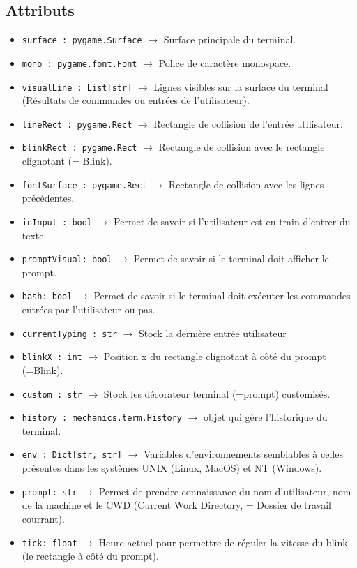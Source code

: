 \documentclass{report}
\begin{document}
\subsection*{Attributs}
\begin{itemize}
  \item \texttt{surface : pygame.Surface}		$\rightarrow$ Surface principale du terminal.
  \item \texttt{mono : pygame.font.Font}		$\rightarrow$ Police de caractère monospace.
  \item \texttt{visualLine : List[str]}		$\rightarrow$ Lignes visibles sur la surface du terminal (Résultats de commandes ou entrées de l'utilisateur).
  \item \texttt{lineRect : pygame.Rect}		$\rightarrow$ Rectangle de collision de l’entrée utilisateur.
  \item \texttt{blinkRect : pygame.Rect}		$\rightarrow$ Rectangle de collision avec le rectangle clignotant (= Blink).
  \item \texttt{fontSurface : pygame.Rect}		$\rightarrow$ Rectangle de collision avec les lignes précédentes.
  \item \texttt{inInput : bool}			$\rightarrow$ Permet de savoir si l’utilisateur est en train d'entrer du texte.
  \item \texttt{promptVisual: bool}			$\rightarrow$ Permet de savoir si le terminal doit afficher le prompt.
  \item \texttt{bash: bool}				$\rightarrow$ Permet de savoir si le terminal doit exécuter les commandes entrées par l'utilisateur ou pas.
  \item \texttt{currentTyping : str}		$\rightarrow$ Stock la dernière entrée utilisateur
  \item \texttt{blinkX : int}			$\rightarrow$ Position x du rectangle clignotant à côté du prompt (=Blink).
  \item \texttt{custom : str}			$\rightarrow$ Stock les décorateur terminal (=prompt) customisés.
  \item \texttt{history : mechanics.term.History}	$\rightarrow$ objet qui gère l'historique du terminal.
  \item \texttt{env : Dict[str, str]}		$\rightarrow$ Variables d'environnements semblables à celles présentes dans les systèmes UNIX (Linux, MacOS) et NT (Windows).
  \item \texttt{prompt: str}		$\rightarrow$ Permet de prendre connaissance du nom d’utilisateur, nom de la machine et le CWD (Current Work Directory, = Dossier de travail courrant).
  \item \texttt{tick: float}		$\rightarrow$ Heure actuel pour permettre de réguler la vitesse du blink (le rectangle à côté du prompt).
\end{itemize}
\end{document}

